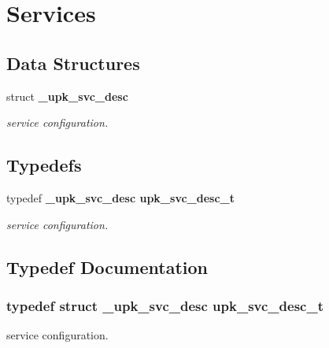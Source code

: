 \section{Services}
\label{group__services}
\subsection*{Data Structures}
\begin{CompactItemize}
\item 
struct \bf{\_\-upk\_\-svc\_\-desc}
\begin{CompactList}\small\item\em service configuration. \item\end{CompactList}\end{CompactItemize}
\subsection*{Typedefs}
\begin{CompactItemize}
\item 
typedef \bf{\_\-upk\_\-svc\_\-desc} \bf{upk\_\-svc\_\-desc\_\-t}
\begin{CompactList}\small\item\em service configuration. \item\end{CompactList}\end{CompactItemize}


\subsection{Typedef Documentation}
\subsubsection{\setlength{\rightskip}{0pt plus 5cm}typedef struct \bf{\_\-upk\_\-svc\_\-desc} \bf{upk\_\-svc\_\-desc\_\-t}}\label{group__services_gdb063e76b698ce0ca834754647dd95ce}


service configuration. 

